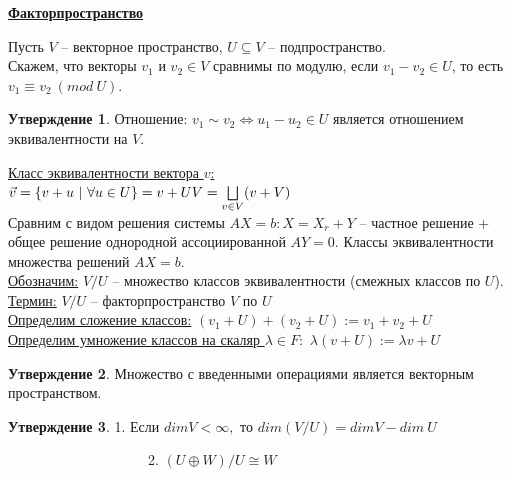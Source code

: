 \documentclass[a4paper, 12pt]{article}
\theoremstyle{definition}
\newtheorem*{subtheorem}{Утверждение}
\begin{document}
    \newpage
    \begin{center}\underline{\textbf{Факторпространство}}\end{center}
    Пусть $V$ -- векторное пространство, $U \subseteq V$ --
    подпространство.\\ Скажем, что векторы $v_1$ и $v_2 \in V$
    сравнимы по модулю, если $v_1 - v_2 \in U$, то есть
    $v_1 \equiv v_2\ (mod\ U)$.
    \begin{subtheorem}
        Отношение: $v_1 \sim v_2 \Longleftrightarrow u_1 - u_2
        \in U$ является отношением эквивалентности на $V$.
    \end{subtheorem}
    \underline{Класс эквивалентности вектора $v$:}\\
    $\vec v = \{v + u\ |\ \forall u \in U\} = v + U\\
    V = \bigsqcup\limits_{v \in V}(v + V)$\\
    Сравним с видом решения системы $AX = b: X = X_r + Y$ -- 
    частное решение + общее решение однородной ассоциированной
    $AY = 0$.  Классы эквивалентности множества решений $AX = b$.
    \\\underline{Обозначим:} $V/U$ -- множество классов
    эквивалентности (смежных классов по $U$).\\
    \underline{Термин:} $V/U$ -- факторпространство $V$ по $U$\\
    \underline{Определим сложение классов:} $(v_1 + U) + (v_2 + U)
    := v_1 + v_2 + U$\\
    \underline{Определим умножение классов на скаляр $\lambda
    \in F:$} $\lambda(v+U) := \lambda v + U$
    \begin{subtheorem}
        Множество с введенными операциями является векторным
        \\пространством.
    \end{subtheorem}
    \begin{subtheorem}
        1. Если $dimV < \infty,$ то $dim(V/U) = dimV - dim\ U$

        \ \ \ \ \ \ \ \ \ \ \ \ \ \ \ \ \ \ \ \ 
        2. $(U\oplus W) / U \cong W$
    \end{subtheorem}
\end{document}
